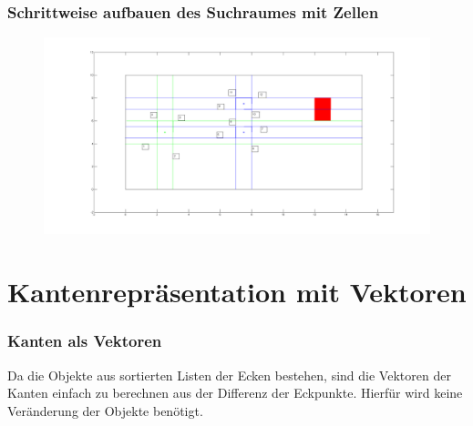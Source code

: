 \documentclass[final]{beamer}
\begin{document}
\begin{frame}
\frametitle{Schrittweise aufbauen des Suchraumes mit Zellen}
\begin{figure}
\centering
\includegraphics[scale=0.175]{../thesis/cellRiddleNumbered}
\end{figure}
\end{frame}


\section{Kantenrepräsentation mit Vektoren}
\begin{frame}
\frametitle{Kanten als Vektoren}
Da die Objekte aus sortierten Listen der Ecken bestehen, sind die Vektoren der Kanten einfach zu berechnen aus der Differenz der Eckpunkte. Hierfür wird keine Veränderung der Objekte benötigt.
\end{frame}
\end{document}
